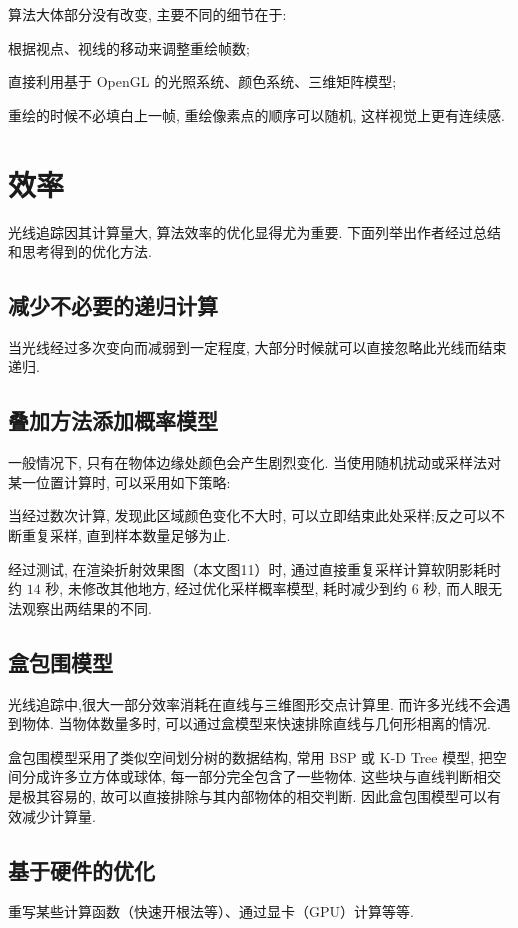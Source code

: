 \documentclass[10pt,twocolumn]{article}
\begin{document}
算法大体部分没有改变, 主要不同的细节在于:

根据视点、视线的移动来调整重绘帧数;

直接利用基于 OpenGL 的光照系统、颜色系统、三维矩阵模型;

重绘的时候不必填白上一帧, 重绘像素点的顺序可以随机, 这样视觉上更有连续感.

\section{\hei 效率}
光线追踪因其计算量大, 算法效率的优化显得尤为重要. 下面列举出作者经过总结和思考得到的优化方法.

\subsection{\hei 减少不必要的递归计算}
当光线经过多次变向而减弱到一定程度, 大部分时候就可以直接忽略此光线而结束递归.

\subsection{\hei 叠加方法添加概率模型}
一般情况下, 只有在物体边缘处颜色会产生剧烈变化. 当使用随机扰动或采样法对某一位置计算时, 可以采用如下策略:

当经过数次计算, 发现此区域颜色变化不大时, 可以立即结束此处采样;反之可以不断重复采样, 直到样本数量足够为止.

经过测试, 在渲染折射效果图（本文图11）时, 通过直接重复采样计算软阴影耗时约 $14$ 秒, 未修改其他地方, 经过优化采样概率模型, 耗时减少到约 $6$ 秒, 而人眼无法观察出两结果的不同.

\subsection{\hei 盒包围模型}
光线追踪中,很大一部分效率消耗在直线与三维图形交点计算里. 而许多光线不会遇到物体. 当物体数量多时, 可以通过盒模型来快速排除直线与几何形相离的情况.

盒包围模型采用了类似空间划分树的数据结构, 常用 BSP 或 K-D Tree 模型, 把空间分成许多立方体或球体, 每一部分完全包含了一些物体. 这些块与直线判断相交是极其容易的, 故可以直接排除与其内部物体的相交判断. 因此盒包围模型可以有效减少计算量.

\subsection{\hei 基于硬件的优化}
重写某些计算函数（快速开根法等）、通过显卡（GPU）计算等等.
\end{document}
